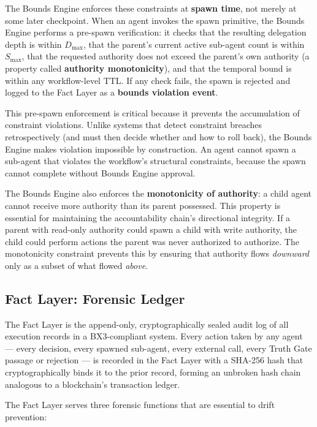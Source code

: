The Bounds Engine enforces these constraints at \textbf{spawn time}, not merely at some later checkpoint. When an agent invokes the spawn primitive, the Bounds Engine performs a pre-spawn verification: it checks that the resulting delegation depth is within $D_{\max}$, that the parent's current active sub-agent count is within $S_{\max}$, that the requested authority does not exceed the parent's own authority (a property called \textbf{authority monotonicity}), and that the temporal bound is within any workflow-level TTL. If any check fails, the spawn is rejected and logged to the Fact Layer as a \textbf{bounds violation event}.

This pre-spawn enforcement is critical because it prevents the accumulation of constraint violations. Unlike systems that detect constraint breaches retrospectively (and must then decide whether and how to roll back), the Bounds Engine makes violation impossible by construction. An agent cannot spawn a sub-agent that violates the workflow's structural constraints, because the spawn cannot complete without Bounds Engine approval.

The Bounds Engine also enforces the \textbf{monotonicity of authority}: a child agent cannot receive more authority than its parent possessed. This property is essential for maintaining the accountability chain's directional integrity. If a parent with read-only authority could spawn a child with write authority, the child could perform actions the parent was never authorized to authorize. The monotonicity constraint prevents this by ensuring that authority flows \emph{downward} only as a subset of what flowed \emph{above}.

\subsection{Fact Layer: Forensic Ledger}

The Fact Layer is the append-only, cryptographically sealed audit log of all execution records in a BX3-compliant system. Every action taken by any agent — every decision, every spawned sub-agent, every external call, every Truth Gate passage or rejection — is recorded in the Fact Layer with a SHA-256 hash that cryptographically binds it to the prior record, forming an unbroken hash chain analogous to a blockchain's transaction ledger.

The Fact Layer serves three forensic functions that are essential to drift prevention:

